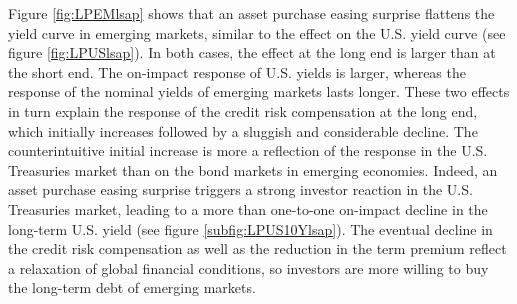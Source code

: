 {Figure \ref{fig:LPEMlsap} shows that an asset purchase easing surprise flattens the yield curve in emerging markets, similar to the effect on the U.S. yield curve (see figure \ref{fig:LPUSlsap}). %
In both cases, the effect at the long end %
is larger than at the short end.
The on-impact response of U.S. yields is larger, whereas the response of the nominal yields of emerging markets lasts longer.
These two effects in turn explain the response of the credit risk compensation at the long end, which %
initially increases followed by a sluggish and considerable decline.
The counterintuitive initial increase %
is more a reflection of the response in the U.S. Treasuries market than on the bond markets in emerging economies.
Indeed, an asset purchase easing surprise triggers a strong investor reaction in the U.S. Treasuries market, leading to a  more than one-to-one on-impact decline in the long-term U.S. yield (see figure \ref{subfig:LPUS10Ylsap}).
The eventual decline in the credit risk compensation as well as the reduction in the term premium reflect a relaxation of global financial conditions, so investors are more willing to buy the long-term debt of emerging markets. 


}
